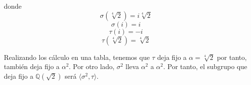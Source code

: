 \documentclass{article}
\theoremstyle{theorem-style}  %
\theoremstyle{definition-style}
\theoremstyle{example-style}
\begin{document}
\begin{enumerate}

\end{enumerate}

donde $$\sigma(\sqrt[4]{2}) = i\sqrt[4]{2}$$
$$\sigma(i) = i$$ $$\tau(i) = -i$$
$$\tau(\sqrt[4]{2}) = \sqrt[4]{2}$$

Realizando los cálculo en una tabla, tenemos que $\tau$ deja fijo a $\alpha = \sqrt[4]{2}$ por tanto, también deja fijo a $\alpha^2$. Por otro lado, $\sigma^2$ lleva $\alpha^2$ a $\alpha^2$. Por tanto, el subgrupo que deja fijo a $\mathbb{Q}(\sqrt{2})$ será $\langle \sigma^2,\tau \rangle$. 




\printbibliography
\end{document}
